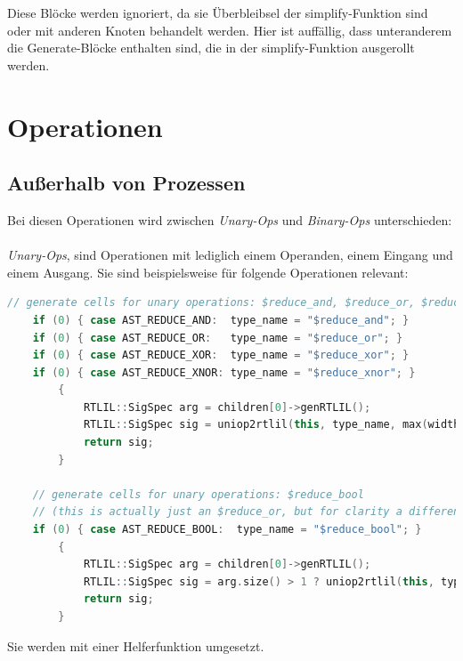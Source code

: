 \documentclass[11pt]{report}
\begin{document}
Diese Blöcke werden ignoriert, da sie Überbleibsel der simplify-Funktion sind oder mit anderen Knoten behandelt werden. Hier ist auffällig, dass unteranderem die Generate-Blöcke enthalten sind, die in der simplify-Funktion ausgerollt werden.
\section{Operationen}
\subsection{Außerhalb von Prozessen}
Bei diesen Operationen wird zwischen \textit{Unary-Ops} und \textit{Binary-Ops} unterschieden:
\\
\\
\textit{Unary-Ops}, sind Operationen mit lediglich einem Operanden, einem Eingang und einem Ausgang. 
Sie sind beispielsweise für folgende Operationen relevant:
\begin{lstlisting}[language=C++]
	// generate cells for unary operations: $reduce_and, $reduce_or, $reduce_xor, $reduce_xnor
	if (0) { case AST_REDUCE_AND:  type_name = "$reduce_and"; }
	if (0) { case AST_REDUCE_OR:   type_name = "$reduce_or"; }
	if (0) { case AST_REDUCE_XOR:  type_name = "$reduce_xor"; }
	if (0) { case AST_REDUCE_XNOR: type_name = "$reduce_xnor"; }
		{
			RTLIL::SigSpec arg = children[0]->genRTLIL();
			RTLIL::SigSpec sig = uniop2rtlil(this, type_name, max(width_hint, 1), arg);
			return sig;
		}

	// generate cells for unary operations: $reduce_bool
	// (this is actually just an $reduce_or, but for clarity a different cell type is used)
	if (0) { case AST_REDUCE_BOOL:  type_name = "$reduce_bool"; }
		{
			RTLIL::SigSpec arg = children[0]->genRTLIL();
			RTLIL::SigSpec sig = arg.size() > 1 ? uniop2rtlil(this, type_name, max(width_hint, 1), arg) : arg;
			return sig;
		}
\end{lstlisting}
Sie werden mit einer Helferfunktion umgesetzt. 
\end{document}
